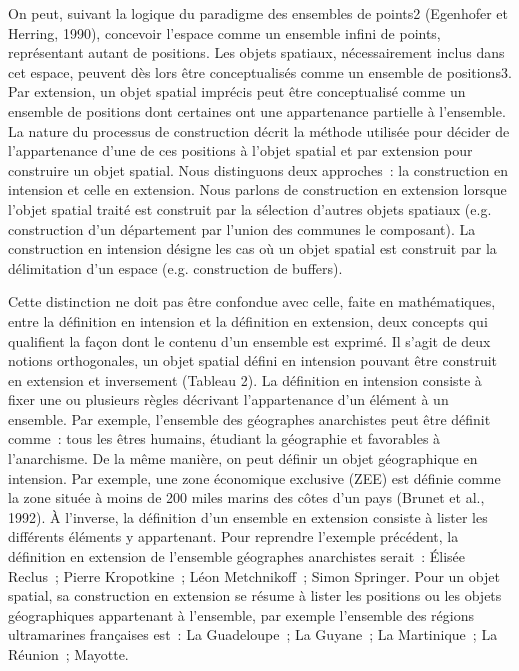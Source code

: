 On peut, suivant la logique du paradigme des ensembles de points2
(Egenhofer et Herring, 1990), concevoir l’espace comme un ensemble
infini de points, représentant autant de positions. Les objets
spatiaux, nécessairement inclus dans cet espace, peuvent dès lors être
conceptualisés comme un ensemble de positions3. Par extension, un
objet spatial imprécis peut être conceptualisé comme un ensemble de
positions dont certaines ont une appartenance partielle à
l’ensemble. La nature du processus de construction décrit la méthode
utilisée pour décider de l’appartenance d’une de ces positions à
l’objet spatial et par extension pour construire un objet
spatial. Nous distinguons deux approches : la construction en
intension et celle en extension. Nous parlons de construction en
extension lorsque l’objet spatial traité est construit par la
sélection d’autres objets spatiaux (e.g. construction d’un département
par l’union des communes le composant). La construction en intension
désigne les cas où un objet spatial est construit par la délimitation
d’un espace (e.g. construction de buffers).

Cette distinction ne doit pas être confondue avec celle, faite en
mathématiques, entre la définition en intension et la définition en
extension, deux concepts qui qualifient la façon dont le contenu d’un
ensemble est exprimé. Il s’agit de deux notions orthogonales, un objet
spatial défini en intension pouvant être construit en extension et
inversement (Tableau 2). La définition en intension consiste à fixer
une ou plusieurs règles décrivant l’appartenance d’un élément à un
ensemble. Par exemple, l’ensemble des géographes anarchistes peut être
définit comme : tous les êtres humains, étudiant la géographie et
favorables à l’anarchisme. De la même manière, on peut définir un
objet géographique en intension. Par exemple, une zone économique
exclusive (ZEE) est définie comme la zone située à moins de 200 miles
marins des côtes d’un pays (Brunet et al., 1992). À l’inverse, la
définition d’un ensemble en extension consiste à lister les différents
éléments y appartenant. Pour reprendre l’exemple précédent, la
définition en extension de l’ensemble géographes anarchistes serait :
Élisée Reclus ; Pierre Kropotkine ; Léon Metchnikoff ; Simon
Springer. Pour un objet spatial, sa construction en extension se
résume à lister les positions ou les objets géographiques appartenant
à l’ensemble, par exemple l’ensemble des régions ultramarines
françaises est : La Guadeloupe ; La Guyane ; La Martinique ; La
Réunion ; Mayotte.

